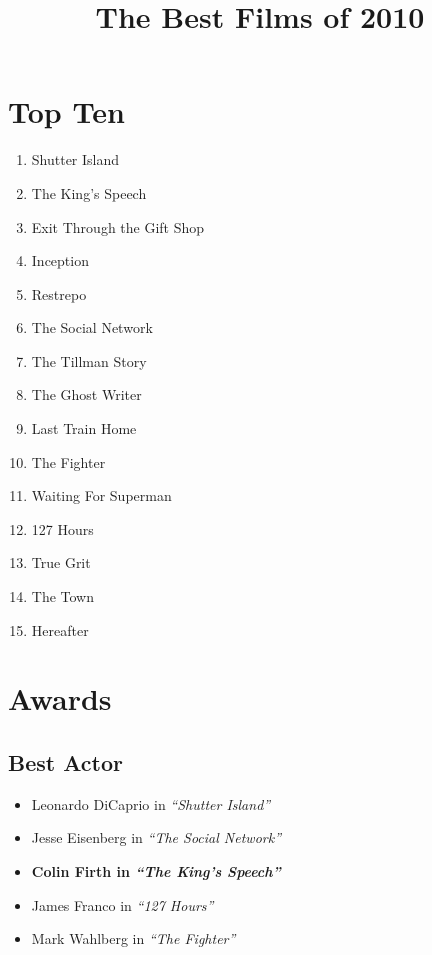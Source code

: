 \documentclass{article}
\begin{document}
\title{The Best Films of 2010}
\date{} %
\maketitle

\begin{multicols}{2}

\section*{\color{Mahogany} Top Ten}
\begin{enumerate}
  \item Shutter Island
  \item The King's Speech
  \item Exit Through the Gift Shop
  \item Inception
  \item Restrepo
  \item The Social Network
  \item The Tillman Story
  \item The Ghost Writer
  \item Last Train Home
  \item The Fighter
  \scriptsize
  \item Waiting For Superman
  \setlength{\parskip}{0pt}
  \setlength{\itemsep}{0pt}
  \item 127 Hours
  \item True Grit
  \item The Town
  \item Hereafter
\end{enumerate}


\footnotesize
\section*{\color{Mahogany} Awards}
\subsection*{Best Actor}
  \begin{itemize}
    \setlength{\parskip}{0pt}
    \setlength{\itemsep}{0pt}
    \item[] Leonardo DiCaprio in \emph{``Shutter Island''}
    \item[] Jesse Eisenberg in \emph{``The Social Network''}
    \item \textbf{Colin Firth in \emph{``The King's Speech''}}
    \item[] James Franco in \emph{``127 Hours''}
    \item[] Mark Wahlberg in \emph{``The Fighter''}
  \end{itemize}


\end{multicols}
\end{document}
